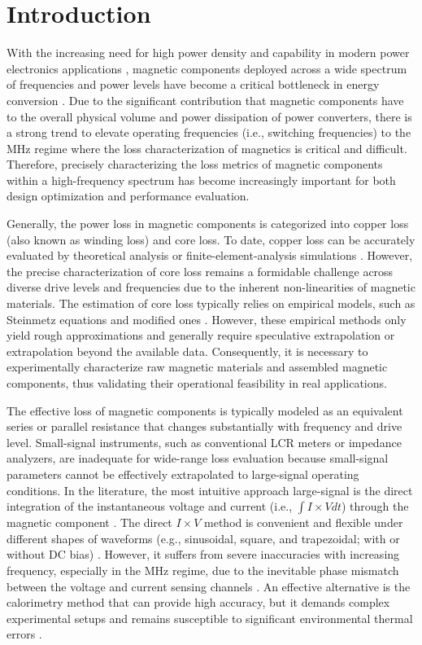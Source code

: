 \documentclass[conference]{IEEEtran}
\begin{document}
\section{Introduction}
With the increasing need for high power density and capability in modern power electronics applications \cite{hwang_ups}, magnetic components deployed across a wide spectrum of frequencies and power levels have become a critical bottleneck in energy conversion \cite{CSullivan1, CMathuna}. Due to the significant contribution that magnetic components have to the overall physical volume and power dissipation of power converters, there is a strong trend to elevate operating frequencies (i.e., switching frequencies) to the MHz regime where the loss characterization of magnetics is critical and difficult. Therefore, precisely characterizing the loss metrics of magnetic components within a high-frequency spectrum has become increasingly important for both design optimization and performance evaluation. 

Generally, the power loss in magnetic components is categorized into copper loss (also known as winding loss) and core loss. To date, copper loss can be accurately evaluated by theoretical analysis or finite-element-analysis simulations \cite{yhan_copper, CSullivan2}. However, the precise characterization of core loss remains a formidable challenge across diverse drive levels and frequencies due to the inherent non-linearities of magnetic materials. The estimation of core loss typically relies on empirical models, such as Steinmetz equations \cite{CSteinmetz, kvenkatachalam} and modified ones \cite{jmuhlethaler, JReinert}. However, these empirical methods only yield rough approximations and generally require speculative extrapolation or extrapolation beyond the available data. Consequently, it is necessary to experimentally characterize raw magnetic materials and assembled magnetic components, thus validating their operational feasibility in real applications.


The effective loss of magnetic components is typically modeled as an equivalent series or parallel resistance that changes substantially with frequency and drive level. Small-signal instruments, such as conventional LCR meters or impedance analyzers, are inadequate for wide-range loss evaluation because small-signal parameters cannot be effectively extrapolated to large-signal operating conditions. In the literature, the most intuitive approach large-signal is the direct integration of the instantaneous voltage and current (i.e., $\int I \times V dt$) through the magnetic component \cite{mmu}. The direct $I \times V$ method is convenient and flexible under different shapes of waveforms (e.g., sinusoidal, square, and trapezoidal; with or without DC bias) \cite{jmuhlethaler2}. However, it suffers from severe inaccuracies with increasing frequency, especially in the MHz regime, due to the inevitable phase mismatch between the voltage and current sensing channels \cite{mmu}. An effective alternative is the calorimetry method that can provide high accuracy, but it demands complex experimental setups and remains susceptible to significant environmental thermal errors \cite{ppapamanolis}. 
\end{document}

